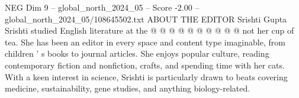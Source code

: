 \begin{textsample}{NEG Dim 9 – global\_north\_2024\_05 – Score -2.00 – global\_north\_2024\_05/108645502.txt}
ABOUT THE EDITOR Srishti Gupta Srishti studied English literature at the @ @ @ @ @ @ @ @ @ @ not her cup of tea.
She has been an editor in every space and content type imaginable, from children ' s books to journal articles.
She enjoys popular culture, reading contemporary fiction and nonfiction, crafts, and spending time with her cats.
With a keen interest in science, Srishti is particularly drawn to beats covering medicine, sustainability, gene studies, and anything biology-related.

\end{textsample}
